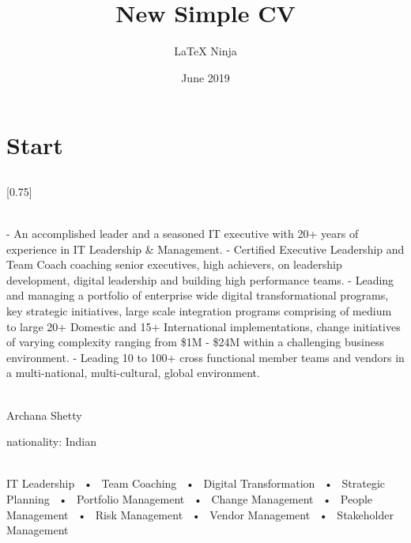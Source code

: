 \documentclass[lighthipster]{simplehipstercv}
\title{New Simple CV}
\author{\LaTeX{} Ninja}
\date{June 2019}
\begin{document}
\thispagestyle{empty}

\section*{Start}


\subsection*{}
\vspace{4em}

\setlength{\columnsep}{1.5cm}
[0.75]
\begin{paracol}{2}

\paracolbackgroundoptions

\footnotesize
{\setasidefontcolour
\flushright
\begin{center}
\end{center}

\\[0.5em]

{\footnotesize
- An accomplished leader and a seasoned IT executive with 20+ years of experience in IT Leadership \& Management.
- Certified Executive Leadership and Team Coach coaching senior executives, high achievers, on leadership development, digital leadership and building high performance teams.
- Leading and managing a portfolio of enterprise wide digital transformational programs, key strategic initiatives, large scale integration programs comprising of medium to large 20+ Domestic and 15+ International implementations, change initiatives of varying complexity ranging from \$1M - \$24M within a challenging business environment.
- Leading 10 to 100+ cross functional member teams and vendors in a multi-national, multi-cultural, global environment.}

\bigskip

 \\[0.5em]
Archana Shetty

nationality: Indian 

\bigskip

 \\[0.5em]

IT Leadership ~•~ Team Coaching ~•~ Digital Transformation ~•~ Strategic Planning ~•~ Portfolio Management ~•~ Change Management ~•~ People Management ~•~ Risk Management ~•~ Vendor Management ~•~ Stakeholder Management

}
\end{paracol}
\end{document}
